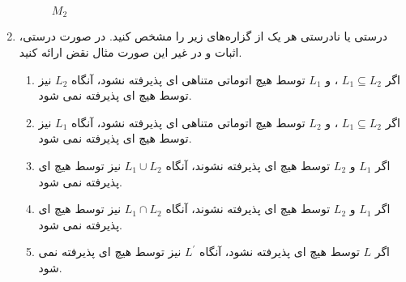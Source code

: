 \documentclass{article}
\begin{document}
\begin{enumerate}
		\begin{figure}[h]
			\begin{minipage}{0.5\textwidth}
				\centering
				\caption{$M_1$}
				\label{M1}
			\end{minipage}%
			\begin{minipage}{0.5\textwidth}
				\centering
				\caption{$M_2$}
				\label{M2}	 		
			\end{minipage}
		\end{figure}
		
		
		\item 
		درستی یا نادرستی هر یک از گزاره‌های زیر را مشخص کنید. در صورت درستی، اثبات و در غیر این صورت مثال نقض ارائه کنید.
		\begin{enumerate}
			\item 
			اگر  $ L_1 \subseteq L_2 $	، و $L_1 $  توسط  هیچ اتوماتی متناهی ای پذیرفته نشود، آنگاه $L_2 $  نیز توسط هیچ  ای پذیرفته نمی شود.
			\item 
			اگر  $ L_1 \subseteq L_2 $	، و $L_2 $  توسط  هیچ اتوماتی متناهی ای پذیرفته نشود، آنگاه $L_1 $  نیز توسط هیچ  ای پذیرفته نمی شود.
			\item 
			اگر $L_1 $ و $L_2 $ توسط هیچ  ای پذیرفته نشوند، آنگاه $ L_1 \cup L_2 $ نیز توسط هیچ  ای پذیرفته نمی شود.
			\item 
			اگر $L_1 $ و $L_2 $ توسط هیچ  ای پذیرفته نشوند، آنگاه $ L_1 \cap L_2 $ نیز توسط هیچ  ای پذیرفته نمی شود.
			\item 
			اگر $L $ توسط هیچ  ای پذیرفته نشود، آنگاه $ L ^ \prime $ نیز توسط هیچ  ای پذیرفته نمی شود.
			
			
			
		\end{enumerate}
		
	\end{enumerate}
	
	
\end{document}
